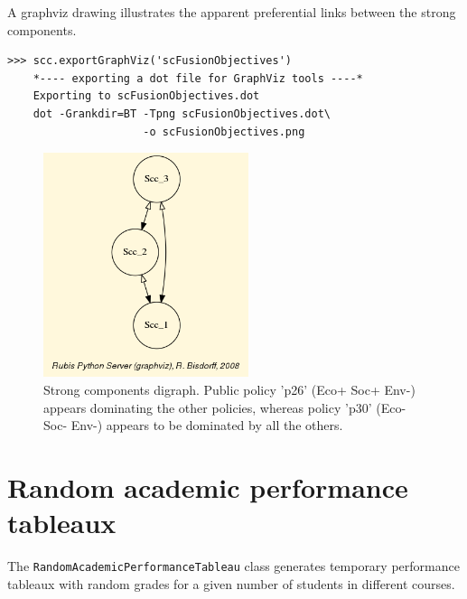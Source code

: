 A graphviz drawing illustrates the apparent preferential links between the strong components.
\begin{lstlisting}[basicstyle=\footnotesize]
   >>> scc.exportGraphViz('scFusionObjectives')
    *---- exporting a dot file for GraphViz tools ----*
    Exporting to scFusionObjectives.dot
    dot -Grankdir=BT -Tpng scFusionObjectives.dot\
                     -o scFusionObjectives.png
\end{lstlisting}
\begin{figure}[h]
\sidecaption
\includegraphics[width=6cm]{Figures/sccFusionObjectives.png}
\caption{Strong components digraph. Public policy 'p26' (Eco+ Soc+ Env-) appears dominating the other policies, whereas policy 'p30' (Eco- Soc- Env-) appears to be dominated by all the others.}
\label{fig:5.3}       %
\end{figure}
	   

\section{Random academic performance tableaux}
\label{sec:5.5}

The \texttt{RandomAcademicPerformanceTableau} class generates temporary performance tableaux with random grades for a given number of students in different courses. 

